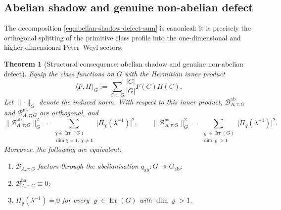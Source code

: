 \documentclass[11pt,a4paper]{amsart}
\theoremstyle{plain}
\newtheorem{theorem}{Theorem}[section]
\theoremstyle{definition}
\theoremstyle{remark}
\DeclareMathOperator{\Irr}{Irr}
\newcommand{\abs}[1]{\lvert #1 \rvert}
\newcommand{\norm}[1]{\lVert #1 \rVert}
\begin{document}
\subsection{Abelian shadow and genuine non-abelian defect}

The decomposition
\eqref{eq:abelian-shadow-defect-sum} is canonical: it is precisely the
orthogonal splitting of the primitive class profile into the
one-dimensional and higher-dimensional Peter--Weyl sectors.

\begin{theorem}[Structural consequence: abelian shadow and genuine
  non-abelian defect]
  \label{thm:abelian-shadow-defect}
  Equip the class functions on \(G\) with the Hermitian inner product
  \[
    \langle F,H\rangle_G
    :=
    \sum_{C\subset G}\frac{|C|}{|G|}F(C)\overline{H(C)}.
  \]
  Let \(\norm{\cdot}_G\) denote the induced norm.
  With respect to this inner product,
  \(\mathcal B_{A,\tau;G}^{\mathrm{ab}}\) and \(\mathcal B_{A,\tau;G}^{\mathrm{na}}\)
  are orthogonal, and
  \begin{equation}\label{eq:abelian-shadow-defect-energy}
    \norm{\mathcal B_{A,\tau;G}^{\mathrm{ab}}}_G^2
    =
    \sum_{\substack{\chi\in\Irr(G)\\ \dim\chi=1,\ \chi\neq \mathbf 1}}
      \abs{\Pi_\chi(\lambda^{-1})}^2,
    \qquad
    \norm{\mathcal B_{A,\tau;G}^{\mathrm{na}}}_G^2
    =
    \sum_{\substack{\varrho\in\Irr(G)\\ \dim\varrho>1}}
      \abs{\Pi_\varrho(\lambda^{-1})}^2.
  \end{equation}
  Moreover, the following are equivalent:
  \begin{enumerate}[label=\textup{(\roman*)}]
    \item \(\mathcal B_{A,\tau;G}\) factors through the abelianisation
      \(q_{\mathrm{ab}}:G\twoheadrightarrow G_{\mathrm{ab}}\);
    \item \(\mathcal B_{A,\tau;G}^{\mathrm{na}}\equiv 0\);
    \item \(\Pi_\varrho(\lambda^{-1})=0\) for every
      \(\varrho\in\Irr(G)\) with \(\dim\varrho>1\).
  \end{enumerate}
\end{theorem}
\end{document}
